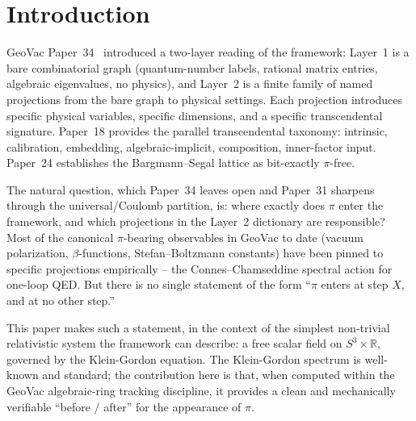 \documentclass[11pt]{article}
\begin{document}
\begin{abstract}
Beyond the verification sprints $\mathrm{KG}\text{-}1$,
$\mathrm{KG}\text{-}2$, $\mathrm{KG}\text{-}3$ and the closed forms
reported in Sections~\ref{sec:casimir} and~\ref{sec:tx_b}
(among them the $S^5$ conformal $-31/60480$ and the Bargmann--Segal
harmonic-oscillator $-17/3840$, both computed here), this paper
introduces no new computation.
Its contribution is the structural observation that \emph{time, not
mass}, is the projection axis along which $\pi$ enters the framework,
and that the observer's finite-time measurement window, read as a
periodic Euclidean circle (an identification the paper adopts rather
than derives;\ Proposition~\ref{prop:two_rows}), is the formal
mechanism.
\end{abstract}

\section{Introduction}
\label{sec:intro}

GeoVac Paper~34~\cite{paper34} introduced a two-layer reading of the
framework: Layer~1 is a bare combinatorial graph (quantum-number labels,
rational matrix entries, algebraic eigenvalues, no physics), and Layer~2
is a finite family of named projections from the bare graph to physical
settings.  Each projection introduces specific physical variables,
specific dimensions, and a specific transcendental signature.  Paper~18
\cite{paper18} provides the parallel transcendental taxonomy:
intrinsic, calibration, embedding, algebraic-implicit, composition,
inner-factor input.  Paper~24
\cite{paper24} establishes the Bargmann--Segal lattice as bit-exactly
$\pi$-free.

The natural question, which Paper~34 leaves open and Paper~31
\cite{paper31} sharpens through the universal/Coulomb partition, is:
where exactly does $\pi$ enter the framework, and which projections in
the Layer~2 dictionary are responsible?  Most of the canonical
$\pi$-bearing observables in GeoVac to date (vacuum polarization,
$\beta$-functions, Stefan--Boltzmann constants) have been pinned to
specific projections empirically -- the
Connes--Chamseddine spectral action for one-loop QED.
But there is no single statement of the form ``$\pi$ enters at step $X$,
and at no other step.''

This paper makes such a statement, in the context of the simplest
non-trivial relativistic system the framework can describe: a free
scalar field on $S^3 \times \mathbb{R}$, governed by the Klein-Gordon
equation.  The Klein-Gordon spectrum is well-known and standard; the
contribution here is that, when computed within the GeoVac
algebraic-ring tracking discipline, it provides a clean and
mechanically verifiable ``before / after'' for the appearance of $\pi$.
\end{document}
